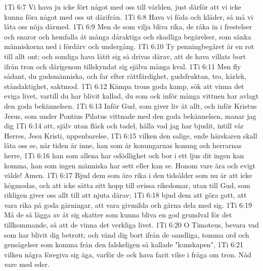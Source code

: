 1Ti 6:7  Vi hava ju icke fört något med oss till världen, just därför att vi icke kunna föra något med oss ut därifrån.
1Ti 6:8  Hava vi föda och kläder, så må vi låta oss nöja därmed.
1Ti 6:9  Men de som vilja bliva rika, de råka in i frestelser och snaror och hemfalla åt många dåraktiga och skadliga begärelser, som sänka människorna ned i fördärv och undergång.
1Ti 6:10  Ty penningbegäret är en rot till allt ont; och somliga hava låtit sig så drivas därav, att de hava villats bort ifrån tron och därigenom tillskyndat sig själva många kval.
1Ti 6:11  Men fly sådant, du gudsmänniska, och far efter rättfärdighet, gudsfruktan, tro, kärlek, ståndaktighet, saktmod.
1Ti 6:12  Kämpa trons goda kamp, sök att vinna det eviga livet, vartill du har blivit kallad, du som ock inför många vittnen har avlagt den goda bekännelsen.
1Ti 6:13  Inför Gud, som giver liv åt allt, och inför Kristus Jesus, som under Pontius Pilatus vittnade med den goda bekännelsen, manar jag dig
1Ti 6:14  att, själv utan fläck och tadel, hålla vad jag har bjudit, intill vår Herres, Jesu Kristi, uppenbarelse,
1Ti 6:15  vilken den salige, ende härskaren skall låta oss se, när tiden är inne, han som är konungarnas konung och herrarnas herre,
1Ti 6:16  han som allena har odödlighet och bor i ett ljus dit ingen kan komma, han som ingen människa har sett eller kan se. Honom vare ära och evigt välde! Amen.
1Ti 6:17  Bjud dem som äro rika i den tidsålder som nu är att icke högmodas, och att icke sätta sitt hopp till ovissa rikedomar, utan till Gud, som rikligen giver oss allt till att njuta därav;
1Ti 6:18  bjud dem att göra gott, att vara rika på goda gärningar, att vara givmilda och gärna dela med sig.
1Ti 6:19  Må de så lägga av åt sig skatter som kunna bliva en god grundval för det tillkommande, så att de vinna det verkliga livet.
1Ti 6:20  O Timoteus, bevara vad som har blivit dig betrott; och vänd dig bort ifrån de oandliga, tomma ord och gensägelser som komma från den falskeligen så kallade "kunskapen",
1Ti 6:21  vilken några föregiva sig äga, varför de ock hava farit vilse i fråga om tron. Nåd vare med eder.


